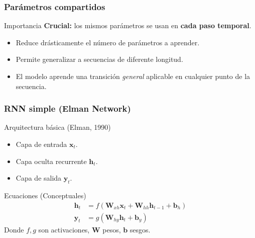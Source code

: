 \documentclass[handout]{beamer}
\newcommand{\vect}[1]{\mathbf{#1}} %
\newcommand{\mat}[1]{\mathbf{#1}}  %
\begin{document}
\begin{frame}
    \frametitle{Parámetros compartidos}
    \begin{alertblock}{Importancia}
        \textbf{Crucial:} los mismos parámetros se usan en \textbf{cada paso temporal}.
        \begin{itemize}
            \item Reduce drásticamente el número de parámetros a aprender.
            \item Permite generalizar a secuencias de diferente longitud.
            \item El modelo aprende una transición \textit{general} aplicable en cualquier punto de la secuencia.            
        \end{itemize}
    \end{alertblock}
\end{frame}

\begin{frame}
    \frametitle{RNN simple (Elman Network)}
        \begin{block}{Arquitectura básica (Elman, 1990)}
            \begin{itemize}
                \item Capa de entrada $\vect{x}_t$.
                \item Capa oculta recurrente $\vect{h}_t$.
                \item Capa de salida $\vect{y}_t$.
            \end{itemize}
        \end{block}
        \begin{block}{Ecuaciones (Conceptuales)} %
            \begin{align*}
                \vect{h}_t &= f(\mat{W}_{xh} \vect{x}_t + \mat{W}_{hh} \vect{h}_{t-1} + \vect{b}_h) \\
                \vect{y}_t &= g(\mat{W}_{hy} \vect{h}_t + \vect{b}_y)
            \end{align*}
            \footnotesize Donde $f, g$ son activaciones, $\mat{W}$ pesos, $\vect{b}$ sesgos. %
        \end{block}
\end{frame}
\end{document}
